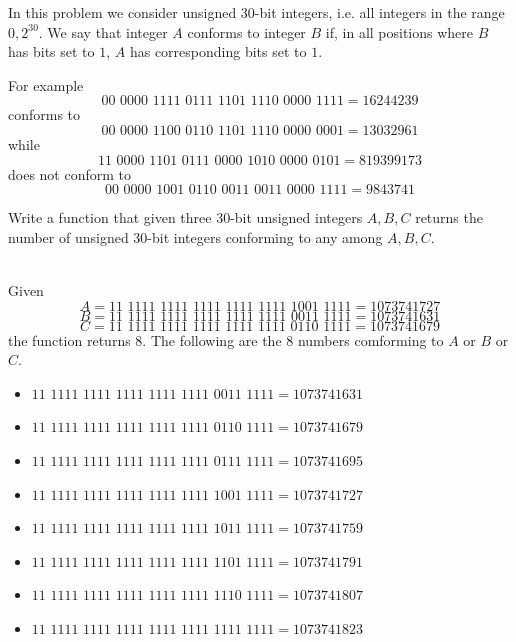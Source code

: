 \begin{exercise}
\label{example:count_numbers_conforming_bitmask:exercice1}
In this problem we consider unsigned 30-bit integers, i.e. all integers in the range $0,2^{30}$.
We say that integer $A$ conforms to integer $B$ if, in all positions where $B$ has bits set to $1$, $A$ has corresponding bits set to $1$.

For example $$\textrm{00 0000 1111 0111 1101 1110 0000 1111} = 16244239$$ conforms to $$\textrm{00 0000 1100 0110 1101 1110 0000 0001} = 13032961$$ while $$\textrm{11 0000 1101 0111 0000 1010 0000 0101} = 819399173$$ does not conform to $$\textrm{00 0000 1001 0110 0011 0011 0000 1111} =9843741$$

Write a function that given three 30-bit unsigned integers $A,B,C$ returns the number of unsigned 30-bit integers conforming to any among $A,B,C$.

    \begin{example}
        \label{example:count_numbers_conforming_bitmask:example1}
        \hfill \\
        Given $$A = \textrm{11 1111 1111 1111 1111 1111 1001 1111} = 1073741727$$
        $$B = \textrm{11 1111 1111 1111 1111 1111 0011 1111} = 1073741631$$
        $$C = \textrm{11 1111 1111 1111 1111 1111 0110 1111} = 1073741679$$
        the function returns $8$. The following are the $8$ numbers comforming to $A$ or $B$ or $C$.
        \begin{itemize}
            \item  $\textrm{11 1111 1111 1111 1111 1111 0011 1111} = 1073741631$
            \item  $\textrm{11 1111 1111 1111 1111 1111 0110 1111} = 1073741679$
            \item  $\textrm{11 1111 1111 1111 1111 1111 0111 1111} = 1073741695$
            \item  $\textrm{11 1111 1111 1111 1111 1111 1001 1111} = 1073741727$
            \item  $\textrm{11 1111 1111 1111 1111 1111 1011 1111} = 1073741759$
            \item  $\textrm{11 1111 1111 1111 1111 1111 1101 1111} = 1073741791$
            \item  $\textrm{11 1111 1111 1111 1111 1111 1110 1111} = 1073741807$
            \item  $\textrm{11 1111 1111 1111 1111 1111 1111 1111} = 1073741823$
        \end{itemize}

    \end{example}

\end{exercise}


